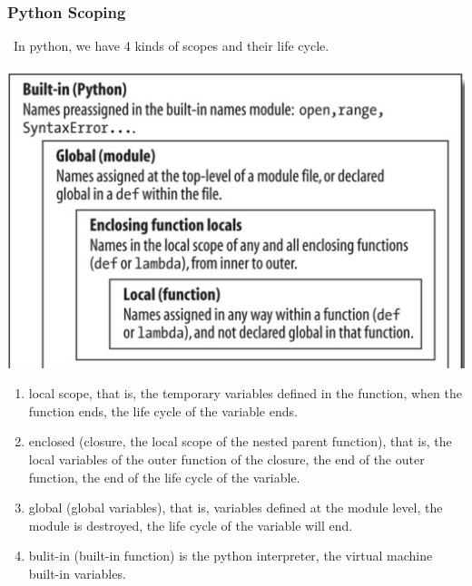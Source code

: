 \documentclass[a4paper]{article}
\theoremstyle{definition}
\begin{document}
\subsubsection{Python Scoping}
\
In python, we have 4 kinds of scopes and their life cycle.

\includegraphics[width=14cm]{img/Snipaste_2021-04-24_02-41-32.png}
\begin{enumerate}
  \item local scope,  that is, the temporary variables defined in the function, when the function ends, the life cycle of the variable ends.

  \item enclosed (closure, the local scope of the nested parent function), that is, the local variables of the outer function of the closure, the end of the outer function, the end of the life cycle of the variable.
  \item global (global variables), that is, variables defined at the module level, the module is destroyed, the life cycle of the variable will end.
  \item bulit-in (built-in function) is the python interpreter, the virtual machine built-in variables.
\end{enumerate}
\end{document}
